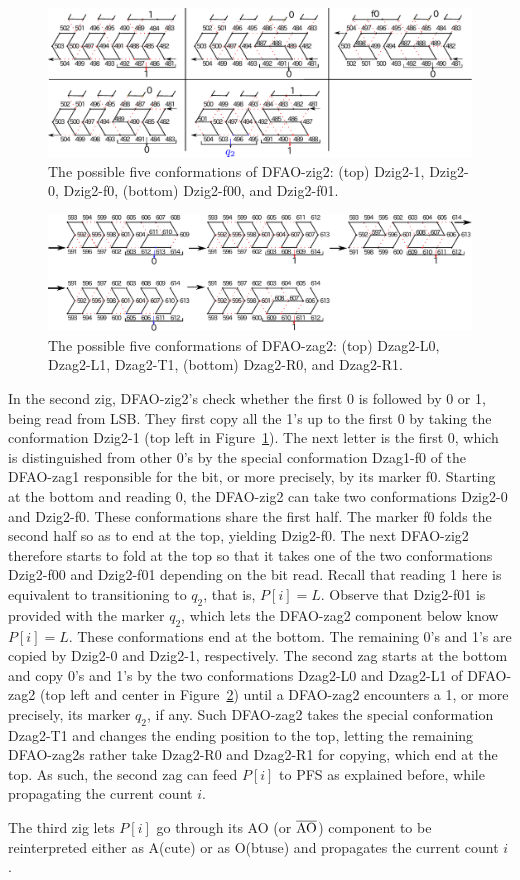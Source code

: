 \begin{figure}[h]
\centering
\includegraphics[width=\linewidth]{pic/Dzig2.pdf}
  \caption{The possible five conformations of DFAO-zig2: (top) Dzig2-1, Dzig2-0, Dzig2-f0, (bottom) Dzig2-f00, and Dzig2-f01. }
  \label{fig:DFAO-zig2}
\end{figure} 

\begin{figure}[h]
\centering
\includegraphics[width=\linewidth]{pic/Dzag2.pdf}
  \caption{The possible five conformations of DFAO-zag2: (top) Dzag2-L0, Dzag2-L1, Dzag2-T1, (bottom) Dzag2-R0, and Dzag2-R1.}
  \label{fig:DFAO-zag2}
  \end{figure} 

In the second zig, DFAO-zig2's check whether the first 0 is followed by 0 or 1, being read from LSB.
They first copy all the 1's up to the first 0 by taking the conformation Dzig2-1 (top left in Figure~\ref{fig:DFAO-zig2}).
The next letter is the first 0, which is distinguished from other 0's by the special conformation Dzag1-f0 of the DFAO-zag1 responsible for the bit, or more precisely, by its marker f0. 
Starting at the bottom and reading 0, the DFAO-zig2 can take two conformations Dzig2-0 and Dzig2-f0.
These conformations share the first half.
The marker f0 folds the second half so as to end at the top, yielding Dzig2-f0. 
The next DFAO-zig2 therefore starts to fold at the top so that it takes one of the two conformations Dzig2-f00 and Dzig2-f01 depending on the bit read.
Recall that reading 1 here is equivalent to transitioning to $q_2$, that is, $P[i] = L$.
Observe that Dzig2-f01 is provided with the marker $q_2$, which lets the DFAO-zag2 component below know $P[i] = L$. 
These conformations end at the bottom.
The remaining 0's and 1's are copied by Dzig2-0 and Dzig2-1, respectively.
The second zag starts at the bottom and copy 0's and 1's by the two conformations Dzag2-L0 and Dzag2-L1 of DFAO-zag2 (top left and center in Figure~\ref{fig:DFAO-zag2}) until a DFAO-zag2 encounters a 1, or more precisely, its marker $q_2$, if any. 
Such DFAO-zag2 takes the special conformation Dzag2-T1 and changes the ending position to the top, letting the remaining DFAO-zag2s rather take Dzag2-R0 and Dzag2-R1 for copying, which end at the top.
As such, the second zag can feed $P[i]$ to PFS as explained before, while propagating the current count $i$.

The third zig lets $P[i]$ go through its AO (or $\overline{\rm AO}$) component to be reinterpreted either as A(cute) or as O(btuse) and propagates the current count $i$.   




